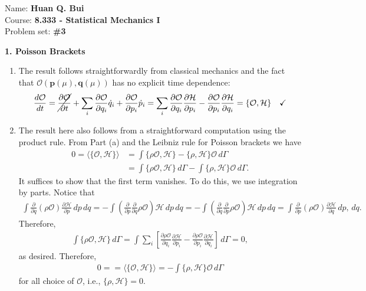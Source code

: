 \documentclass{article}
\theoremstyle{definition}
\newcommand{\p}{\partial}
\newcommand{\ham}{\mathcal{H}}
\newcommand{\f}[2]{\frac{#1}{#2}}
\newcommand{\lp}{\left(}
\newcommand{\rp}{\right)}
\newcommand{\lb}{\left[}
\newcommand{\rb}{\right]}
\begin{document}
		\begin{framed}
			\noindent Name: \textbf{Huan Q. Bui}\\
			Course: \textbf{8.333 - Statistical Mechanics I}\\
			Problem set: \textbf{\#3}
		\end{framed}
	



\noindent \textbf{1. Poisson Brackets}

\begin{enumerate}[label=(\alph*)]
	\item The result follows straightforwardly from classical mechanics and the fact that $\mathcal{O(\mathbf{p}(\mu), \mathbf{q}(\mu))}$ has no explicit time dependence:
	\begin{align*}
	\f{d\mathcal{O}}{d t} = \cancel{\f{\p \mathcal{O}}{\p t}} 
	+ \sum_i\f{\p \mathcal{O}}{\p q_i}\dot{q}_i + \f{\p \mathcal{O}}{\p p_i} \dot{p}_i 
	= \sum_i \f{\p \mathcal{O}}{\p q_i}\f{\p \ham }{\p p_i} - \f{\p \mathcal{O}}{\p p_i}\f{\p \ham}{\p q_i}
	 = \{ \mathcal{O},\ham \} \quad\checkmark
	\end{align*}
	
	\item The result here also follows from a straightforward computation using the product rule. From Part (a) and the Leibniz rule for Poisson brackets we have
	\begin{align*}
	0 =\langle \{ \mathcal{O}, \ham \}\rangle 
	&= \int \{ \rho \mathcal{O}, \ham \} - \{ \rho,\ham  \}\mathcal{O}  \,d\Gamma \\
	&= \int \{ \rho \mathcal{O}, \ham \}\,d\Gamma - \int \{ \rho,\ham  \}\mathcal{O}  \,d\Gamma. 
	\end{align*}
	It suffices to show that the first term vanishes. To do this, we use integration by parts. Notice that
	\begin{align*}
	\int \f{\p}{\p q} (\rho \mathcal{O}) \f{\p \ham }{\p p}  \,dp\,dq = -\int \lp \f{\p}{\p p} \f{\p}{\p q} \rho \mathcal{O}\rp \ham  \,dp\, dq = -\int \lp \f{\p}{\p q} \f{\p}{\p p} \rho \mathcal{O}\rp \ham  \,dp\, dq = \int \f{\p}{\p p}(\rho \mathcal{O}) \f{\p \ham}{\p q} \,dp,\,dq.
	\end{align*}
	Therefore, 
	\begin{align*}
	\int \{ \rho \mathcal{O}, \ham \}\,d\Gamma = \int \sum_i \lb \f{\p \rho \mathcal{O}}{\p q_i}\f{\p \ham}{\p p_i} - \f{\p \rho \mathcal{O}}{\p p_i}\f{\p \ham}{\p q_i} \rb \,d\Gamma = 0,
	\end{align*}
	as desired. Therefore, 
	\begin{align*}
	0 = =\langle \{ \mathcal{O}, \ham \}\rangle = -\int \{ \rho,\ham  \}\mathcal{O}  \,d\Gamma
	\end{align*}
	for all choice of $\mathcal{O}$, i.e., $\{  \rho, \ham \} = 0$. 
	
\end{enumerate}
\end{document}
